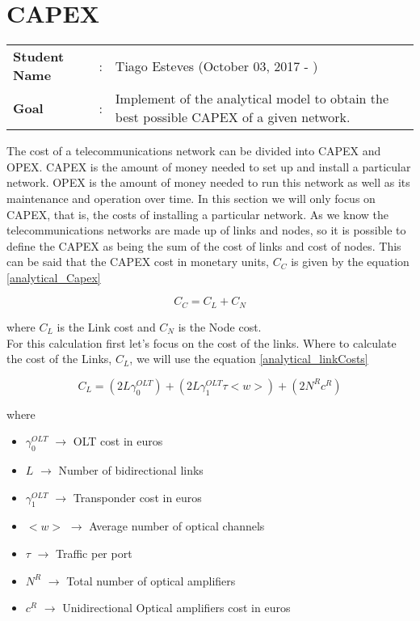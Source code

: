 \clearpage

\section{CAPEX}\label{analytical_CAPEX}
\begin{tcolorbox}	
\begin{tabular}{p{2.75cm} p{0.2cm} p{10.5cm}} 	
\textbf{Student Name}  &:& Tiago Esteves    (October 03, 2017 - )\\
\textbf{Goal}          &:& Implement of the analytical model to obtain the best possible CAPEX of a given network.
\end{tabular}
\end{tcolorbox}
\vspace{11pt}

The cost of a telecommunications network can be divided into CAPEX and OPEX.
CAPEX is the amount of money needed to set up and install a particular network.
OPEX is the amount of money needed to run this network as well as its maintenance and operation over time.
In this section we will only focus on CAPEX, that is, the costs of installing a particular network.
As we know the telecommunications networks are made up of links and nodes, so it is possible to define the CAPEX as being the sum of the cost of links and cost of nodes.
This can be said that the CAPEX cost in monetary units, $C_C$ is given by the equation \ref{analytical_Capex}

\begin{equation}
C_C = C_L + C_N
\label{analytical_Capex}
\end{equation}

\noindent
where $C_L$ is the Link cost and $C_N$ is the Node cost.\\

For this calculation first let's focus on the cost of the links. Where to calculate the cost of the Links, $C_L$, we will use the equation \ref{analytical_linkCosts}

\begin{equation}
C_L = \left(2 L \gamma_0^{OLT}\right) + \left(2 L \gamma_1^{OLT} \tau <w>\right) + \left(2 N^R c^R\right)
\label{analytical_linkCosts}
\end{equation}

\vspace{11pt}
\noindent
where
\begin{itemize}
\item{$\gamma_0^{OLT}$	$\rightarrow$	OLT cost in euros}
\item{$L$				$\rightarrow$	Number of bidirectional links}
\item{$\gamma_1^{OLT}$	$\rightarrow$	Transponder cost in euros}
\item{$<w>$             $\rightarrow$   Average number of optical channels}
\item{$\tau$		    $\rightarrow$	Traffic per port}
\item{$N^R$				$\rightarrow$	Total number of optical amplifiers}
\item{$c^R$				$\rightarrow$	Unidirectional Optical amplifiers cost in euros}
\end{itemize}

